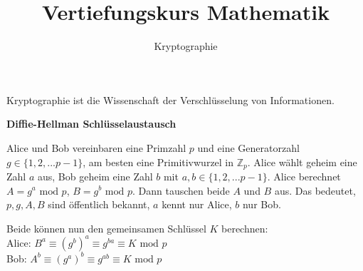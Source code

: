 \usepackage[ngerman]{babel}
\usepackage[utf8]{inputenc}
\usepackage{amsmath}
\usepackage{amssymb}
\usepackage{listings} 
\usepackage{stmaryrd}
\lstset{language=Python, tabsize=4, showstringspaces=false,basicstyle=\footnotesize,mathescape=true} 
\usepackage{mathtools}
\usepackage{ulem}
\usepackage{tikz}

\parskip 10pt
\newcommand{\ggT}{\operatorname{ggT}}
\newcommand{\Mod}[3]{#1\equiv#2\text{ mod }#3}
\newcommand{\tmod}{\text{ mod }}



\title{Vertiefungskurs Mathematik}   
\author{Kryptographie} 
\date{}
\frame{\titlepage} 

\begin{frame}[fragile]

Kryptographie ist die Wissenschaft der Verschlüsselung von Informationen. \pause

\textbf{Diffie-Hellman Schlüsselaustausch} \pause

Alice und Bob vereinbaren eine Primzahl $p$ und eine Generatorzahl $g \in \{1,2,...p-1\}$, am besten eine Primitivwurzel in 
$\mathbb{Z}_p$. \pause Alice wählt geheim eine Zahl $a$ aus, Bob geheim eine Zahl $b$ mit $a,b \in \{1,2,...p-1\}$. \pause
Alice berechnet $A = g^a \tmod p$,  $B = g^b \tmod p$. \pause Dann tauschen beide $A$ und $B$ aus. \pause Das bedeutet, 
$p,g,A,B$ sind öffentlich bekannt, $a$ kennt nur Alice, $b$ nur Bob. \pause

Beide können nun den gemeinsamen Schlüssel $K$ berechnen: \\
Alice: $B^a \equiv (g^b)^a \equiv g^{ba} \equiv K \tmod p$ \\
Bob: $A^b \equiv (g^a)^b \equiv g^{ab} \equiv K \tmod p$ 

\end{frame}

